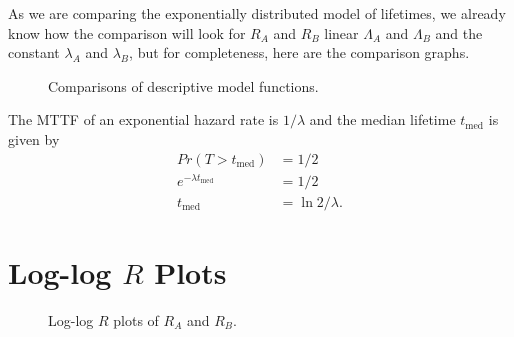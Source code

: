 As we are comparing the exponentially distributed model of lifetimes, we already know how the comparison will look for
\(R_A\) and \(R_B\) linear \(\Lambda_A\) and \(\Lambda_B\) and the constant \(\lambda_A\) and \(\lambda_B\), but for completeness, here are the comparison graphs.

\begin{figure}[h]
    \centering
    \begin{subfigure}[b]{0.45\textwidth}
        \label{fig:comp_R}
    \end{subfigure}
    \hfill
    \begin{subfigure}[b]{0.45\textwidth}
        \label{fig:comp_λ}
    \end{subfigure}

    \begin{subfigure}[b]{0.45\textwidth}
        \label{fig:comp_Λ}
    \end{subfigure}
    \caption{Comparisons of descriptive model functions.}
\end{figure}

The \ac{MTTF} of an exponential hazard rate is \(1/\lambda\) and the median lifetime \(t_\text{med}\) is
given by \begin{align*}
    Pr(T > t_\text{med}) &= 1/2 \\
    e^{-\lambda t_\text{med}} &= 1/2 \\
    t_\text{med} &= \ln{2}/\lambda.
\end{align*}

\begin{table}[h]
    \centering
    
    \caption{Comparison of \ac{MTTF} and the median lifetime for groups \(A\) and \(B\).}
    \label{tab:comparison}
\end{table}

\section{Log-log \(R\) Plots}%
\label{sec:loglogR_plot}

\begin{figure}[h]
    \centering
    \caption{Log-log \(R\) plots of \(R_A\) and \(R_B\).}
    \label{fig:log_log_R}
\end{figure}

